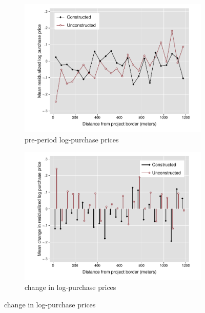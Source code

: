 \documentclass[12pt]{article}
\begin{document}
\begin{figure}[t!]
        \centering
        \caption[ House Prices outside Constructed and Unconstructed Projects Areas ]
        {\small House Prices outside Constructed and Unconstructed projects } 
        \begin{subfigure}[b]{0.495\textwidth}
            \centering
            \includegraphics[width=\textwidth,trim={0.9cm .3cm 0.1cm 0cm}, clip=true]{figures/price_pre_means}
            \caption[Network2]%
            {{\small pre-period log-purchase prices }}    
            \label{fig:preprice}
        \end{subfigure}
        \hfill
        \begin{subfigure}[b]{0.495\textwidth}   
            \centering 
            \includegraphics[width=\textwidth,trim={0.9cm .3cm 0.1cm 0cm}, clip=true]{figures/prices_rawchanges}
            \caption[]%
            {{\small change in log-purchase prices}}    
            \label{fig:changeprice}
        \end{subfigure}
        \label{fig:rawpricemeans}
        \vspace{-6mm}
\end{figure} 
\end{document}
